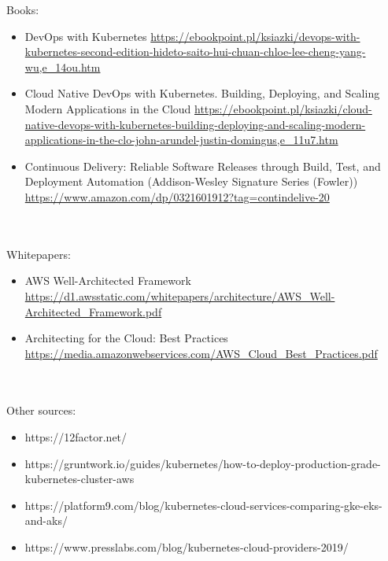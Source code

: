 \documentclass[12pt]{article}
\begin{document}
Books:
\begin{itemize}
    \item DevOps with Kubernetes \url{https://ebookpoint.pl/ksiazki/devops-with-kubernetes-second-edition-hideto-saito-hui-chuan-chloe-lee-cheng-yang-wu,e_14ou.htm}
    \item Cloud Native DevOps with Kubernetes. Building, Deploying, and Scaling Modern Applications in the Cloud \url{https://ebookpoint.pl/ksiazki/cloud-native-devops-with-kubernetes-building-deploying-and-scaling-modern-applications-in-the-clo-john-arundel-justin-domingus,e_11u7.htm}
    \item Continuous Delivery: Reliable Software Releases through Build, Test, and Deployment Automation (Addison-Wesley Signature Series (Fowler)) \url{https://www.amazon.com/dp/0321601912?tag=contindelive-20}
\end{itemize}
\\
\\
Whitepapers:
\begin{itemize}
    \item AWS Well-Architected Framework \url{https://d1.awsstatic.com/whitepapers/architecture/AWS_Well-Architected_Framework.pdf}
    \item Architecting for the Cloud: Best Practices  \url{https://media.amazonwebservices.com/AWS_Cloud_Best_Practices.pdf}
\end{itemize}
\\
\\
Other sources:
\begin{itemize}
    \item https://12factor.net/
    \item https://gruntwork.io/guides/kubernetes/how-to-deploy-production-grade-kubernetes-cluster-aws
    \item https://platform9.com/blog/kubernetes-cloud-services-comparing-gke-eks-and-aks/
    \item  https://www.presslabs.com/blog/kubernetes-cloud-providers-2019/
\end{itemize}
\end{document}

